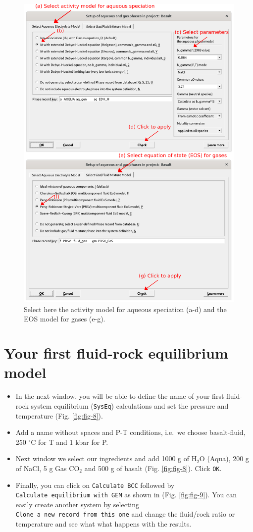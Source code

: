 \documentclass[
]{book}
\begin{document}
\begin{figure}
\includegraphics[width=0.7\linewidth]{figures/module1/fig-7} \caption{Select here the activity model for aqueous speciation (a-d) and the EOS model for gases (e-g).}\label{fig:fig-7}
\end{figure}

\hypertarget{your-first-fluid-rock-equilibrium-model}{%
\section{Your first fluid-rock equilibrium model}\label{your-first-fluid-rock-equilibrium-model}}

\begin{itemize}
\item
  In the next window, you will be able to define the name of your first fluid-rock system equilibrium (\texttt{SysEq}) calculations and set the pressure and temperature (Fig. \ref{fig:fig-8}).
\item
  Add a name without spaces and P-T conditions, i.e.~we choose basalt-fluid, 250 \(^{\circ}\)C for T and 1 kbar for P.
\item
  Next window we select our ingredients and add 1000 g of H\(_2\)O (Aqua), 200 g of NaCl, 5 g Gas CO\(_2\) and 500 g of basalt (Fig. \ref{fig:fig-8}). Click \texttt{OK}.
\item
  Finally, you can click on \texttt{Calculate\ BCC} followed by \texttt{Calculate\ equilibrium\ with\ GEM} as shown in (Fig. \ref{fig:fig-9}). You can easily create another system by selecting \texttt{Clone\ a\ new\ record\ from\ this\ one} and change the fluid/rock ratio or temperature and see what what happens with the results.
\end{itemize}
\end{document}
